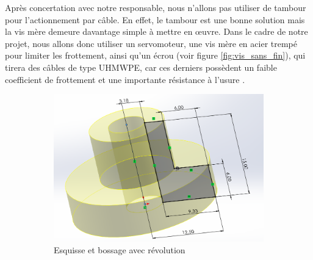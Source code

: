 \documentclass[a4paper, 11pt]{report}
\begin{document}
            Après concertation avec notre responsable, nous n'allons pas utiliser de tambour pour l'actionnement par câble. En effet, le tambour est une bonne solution mais la vis mère demeure davantage simple à mettre en œuvre. Dans le cadre de notre projet, nous allons donc utiliser un servomoteur, une vis mère en acier trempé pour limiter les frottement, ainsi qu'un écrou (voir figure \ref{fig:vis_sans_fin}), qui tirera des câbles de type UHMWPE, car ces derniers possèdent un faible coefficient de frottement et une importante résistance à l'usure \cite{wang_spirobs_2025}.

            \begin{figure}
                \centering
                \begin{subfigure}[t]{0.6\textwidth}
                    \centering
                    \includegraphics[width=\textwidth]{Figures/ecrou_esquisse.png}
                    \caption{Esquisse et bossage avec révolution}
                \end{subfigure}
                \hfill
                \begin{subfigure}[t]{0.3\textwidth}
                    \centering

\end{subfigure}
\end{figure}
\end{document}
